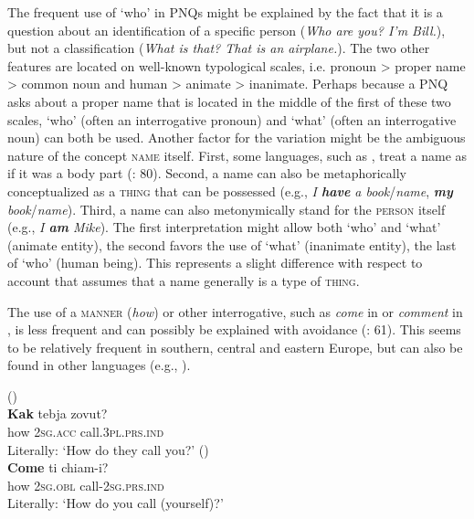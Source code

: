 \documentclass[output=paper,colorlinks,citecolor=brown]{langscibook}
\begin{document}
The frequent use of ‘who’ in PNQs might be explained by the fact that it is a question about an identification of a specific person (\textit{Who are you? I’m Bill.}), but not a classification (\textit{What is that? That is an airplane.}). The two other features are located on well-known typological scales, i.e. pronoun > proper name > common noun and human > animate > inanimate. Perhaps because a PNQ asks about a proper name that is located in the middle of the first of these two scales, ‘who’ (often an interrogative pronoun) and ‘what’ (often an interrogative noun) can both be used. Another factor for the variation might be the ambiguous nature of the concept \textsc{name} itself. First, some languages, such as , treat a name as if it was a body part (\citealt{Abbi2013}: 80). Second, a name can also be metaphorically conceptualized as a \textsc{thing} that can be possessed (e.g., \textit{I \textbf{have} a book}/\textit{name}, \textit{\textbf{my} book}/\textit{name}). Third, a name can also metonymically stand for the \textsc{person} itself (e.g., \textit{I \textbf{am} Mike}). The first interpretation might allow both ‘who’ and ‘what’ (animate entity), the second favors the use of ‘what’ (inanimate entity), the last of ‘who’ (human being). This represents a slight difference with respect to  account that assumes that a name generally is a type of \textsc{thing}.

The use of a \textsc{manner} (\textit{how}) or other interrogative, such as \textit{come} in  or \textit{comment} in , is less frequent and can possibly be explained with avoidance (\citealt{Idiatov2007}: 61). This seems to be relatively frequent in southern, central and eastern Europe, but can also be found in other languages (e.g., \citealt{Gil2018}).

\ea
    \label{example4.26}
     ()\\
    \gll \textbf{Kak}		tebja		zovut?\\
    how		2\textsc{sg.acc}		call.3\textsc{pl.prs.ind}\\
    \glt Literally: ‘How do they call you?’
\ex
    \label{example4.27}
     ()\\
    \gll \textbf{Come}	ti			chiam-i?\\
    how		2\textsc{sg.obl}		call-2\textsc{sg.prs.ind}\\
    \glt Literally: ‘How do you call (yourself)?’
    \z
\end{document}

